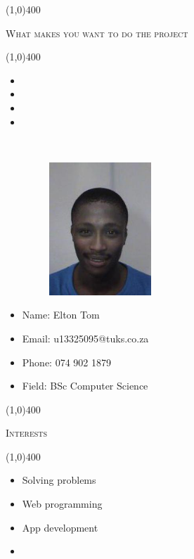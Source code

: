 \documentclass[12pt,a4paper]{report}
\begin{document}
\begin{center}
	
	\line(1,0){400}\\
	{\scshape\large What makes you want to do the project\par}
	\line(1,0){400}\\
	\end{center}
		\begin{itemize}
\item 
\item 
\item 
\item 
\end{itemize}

\newpage
\vspace*{-3cm}\
\begin{minipage}{0.5\textwidth}
\begin{figure}[H]
\includegraphics[width=5cm,height=5cm,keepaspectratio]{u13325095.jpeg}
\end{figure}
\end{minipage} \hfill
\begin{minipage}{0.6\textwidth}
\begin{itemize}
\item[] Name: Elton Tom
\item[] Email: u13325095@tuks.co.za
\item[] Phone: 074 902 1879
\item[] Field: BSc Computer Science
\end{itemize}
\end{minipage}

\begin{center}
	
	\line(1,0){400}\\
	{\scshape\large Interests\par}
	\line(1,0){400}\\
	\end{center}
	\begin{itemize}
	\item 
		Solving problems
	\item 
		Web programming
	\item 
		App development
	\item 
	\end{itemize}
	
\end{document}
